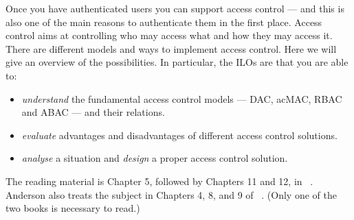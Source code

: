 Once you have authenticated users you can support access control --- and this 
is also one of the main reasons to authenticate them in the first place.
Access control aims at controlling who may access what and how they may access 
it.
There are different models and ways to implement access control.
Here we will give an overview of the possibilities.
In particular, the \acp{ILO} are that you are able to:
\begin{itemize}
  \item \emph{understand} the fundamental access control models --- \ac{DAC}, 
    \ac{acMAC}, \ac{RBAC} and \ac{ABAC} --- and their relations.
  \item \emph{evaluate} advantages and disadvantages of different access 
    control solutions.
  \item \emph{analyse} a situation and \emph{design} a proper access control 
    solution.
\end{itemize}

The reading material is Chapter 5, followed by Chapters 11 and 12, in 
~\cite{Gollmann2011cs}.
Anderson also treats the subject in Chapters 4, 8, and 
9 of ~\cite{Anderson2008sea}.
(Only one of the two books is necessary to read.)

